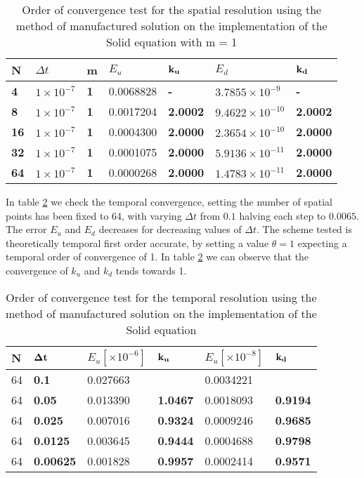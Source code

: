 \begin{table}[H]
\centering
\begin{tabular}{|l|l|l|l|l|l|l|}
\hline
\textbf{N} & $\Delta t$ & \textbf{m} & $E_u $ & $\bold{k_u}$ & $E_d $ & $\bold{k_d}$ \\ \hline
\textbf{4} & $1\times10^{-7}$ & \textbf{1} & 0.0068828 & \textbf{-} & $3.7855 \times 10^{-9} $ & \textbf{-} \\ \hline
\textbf{8} & $1\times10^{-7}$ & \textbf{1} & 0.0017204 & \textbf{2.0002} & $9.4622 \times 10^{-10} $ & \textbf{2.0002} \\ \hline
\textbf{16} & $1\times10^{-7}$ & \textbf{1} & 0.0004300 & \textbf{2.0000} & $2.3654 \times 10^{-10} $ & \textbf{2.0000} \\ \hline
\textbf{32} & $1\times10^{-7}$ & \textbf{1} & 0.0001075 & \textbf{2.0000} & $5.9136 \times 10^{-11} $ & \textbf{2.0000} \\ \hline
\textbf{64} & $1\times10^{-7}$ & \textbf{1} & 0.0000268 & \textbf{2.0000} & $1.4783 \times 10^{-11} $ & \textbf{2.0000} \\ \hline
\end{tabular}
\caption{Order of convergence test for the spatial resolution using the method of manufactured solution on the implementation of the Solid equation with m = 1}
\label{tab:MMS_SOLID_SPACE}
\end{table}


In table \ref{tab:MMS_SOLID_TIME} we check the temporal convergence, setting the number of spatial points has been fixed to 64, with varying $\Delta t $ from $0.1$ halving each step to $0.0065$. The error $E_u$ and $E_d$ decreases for decreasing values of $\Delta t$. The scheme tested is theoretically temporal first order accurate, by setting a value $\theta = 1$ expecting a temporal order of convergence of 1. In table \ref{tab:MMS_SOLID_TIME} we can observe that the convergence of $k_u$ and $k_d$ tends towards 1.

\begin{table}[H]
\centering
\label{tab:MMS_SOLID_TIME}
\begin{tabular}{|l|l|l|l|l|l|}
\hline
N & $\bold{\Delta t}$ & $E_u [\times10^{-6}]$ & $\bold{k_u}$ & $E_u [\times10^{-8}]$ & $\bold{k_d}$ \\ \hline
64 & \textbf{0.1} & 0.027663 & \textbf{} & 0.0034221 & \textbf{} \\ \hline
64 & \textbf{0.05} & 0.013390 & \textbf{1.0467} & 0.0018093 & \textbf{0.9194} \\ \hline
64 & \textbf{0.025} & 0.007016 & \textbf{0.9324} & 0.0009246 & \textbf{0.9685} \\ \hline
64 & \textbf{0.0125} & 0.003645 & \textbf{0.9444} & 0.0004688 & \textbf{0.9798} \\ \hline
64 & \textbf{0.00625} & 0.001828 & \textbf{0.9957} & 0.0002414 & \textbf{0.9571} \\ \hline
\end{tabular}
\caption{Order of convergence test for the temporal resolution using the method of manufactured solution on the implementation of the Solid equation}
\end{table}


